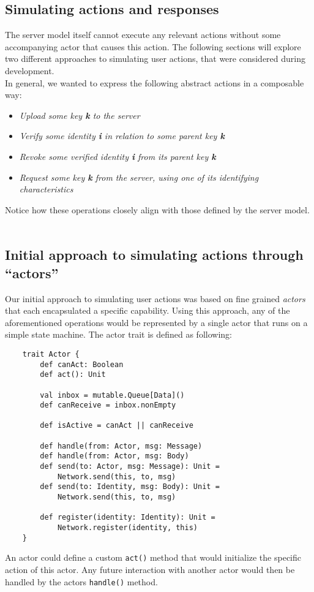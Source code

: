 \subsection{Simulating actions and responses}
The server model itself cannot execute any relevant actions without some accompanying actor that causes this action. The following sections will explore two different approaches to simulating user actions, that were considered during development. \\
In general, we wanted to express the following abstract actions in a composable way: 
\begin{itemize}
    \item \emph{Upload some key \textbf{k} to the server}
    \item \emph{Verify some identity \textbf{i} in relation to some parent key \textbf{k}}
    \item \emph{Revoke some verified identity \textbf{i} from its parent key \textbf{k}}
    \item \emph{Request some key \textbf{k} from the server, using one of its identifying characteristics}
\end{itemize}
Notice how these operations closely align with those defined by the server model.
\\ \\

\subsection{Initial approach to simulating actions through ``actors''}
Our initial approach to simulating user actions was based on fine grained \emph{actors} that each encapsulated a specific capability. 
Using this approach, any of the aforementioned operations would be represented by a single actor that runs on a simple state machine.
The actor trait is defined as following:
\begin{verbatim}
    trait Actor {
        def canAct: Boolean
        def act(): Unit
      
        val inbox = mutable.Queue[Data]()
        def canReceive = inbox.nonEmpty
      
        def isActive = canAct || canReceive
      
        def handle(from: Actor, msg: Message)
        def handle(from: Actor, msg: Body)
        def send(to: Actor, msg: Message): Unit = 
            Network.send(this, to, msg)
        def send(to: Identity, msg: Body): Unit = 
            Network.send(this, to, msg)
      
        def register(identity: Identity): Unit = 
            Network.register(identity, this)
    }
\end{verbatim}
An actor could define a custom \texttt{act()} method that would initialize the specific action of this actor. Any future interaction with another actor would then be handled by the actors \texttt{handle()} method. 

